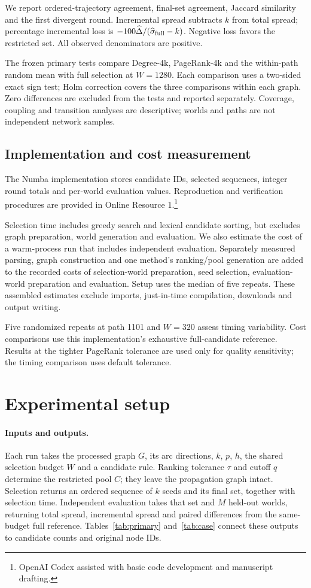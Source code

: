\documentclass[smallextended]{svjour3}
\begin{document}
We report ordered-trajectory agreement, final-set agreement, Jaccard similarity and the first divergent round. Incremental spread subtracts $k$ from total spread; percentage incremental loss is $-100\widehat\Delta/(\widehat\sigma_{\rm full}-k)$. Negative loss favors the restricted set. All observed denominators are positive.

The frozen primary tests compare Degree-4k, PageRank-4k and the within-path random mean with full selection at $W=1280$. Each comparison uses a two-sided exact sign test; Holm correction covers the three comparisons within each graph. Zero differences are excluded from the tests and reported separately. Coverage, coupling and transition analyses are descriptive; worlds and paths are not independent network samples.

\subsection{Implementation and cost measurement}
The Numba implementation stores candidate IDs, selected sequences, integer round totals and per-world evaluation values. Reproduction and verification procedures are provided in Online Resource 1.\footnote{OpenAI Codex assisted with basic code development and manuscript drafting.}

Selection time includes greedy search and lexical candidate sorting, but excludes graph preparation, world generation and evaluation. We also estimate the cost of a warm-process run that includes independent evaluation. Separately measured parsing, graph construction and one method's ranking/pool generation are added to the recorded costs of selection-world preparation, seed selection, evaluation-world preparation and evaluation. Setup uses the median of five repeats. These assembled estimates exclude imports, just-in-time compilation, downloads and output writing.

Five randomized repeats at path 1101 and $W=320$ assess timing variability. Cost comparisons use this implementation's exhaustive full-candidate reference. Results at the tighter PageRank tolerance are used only for quality sensitivity; the timing comparison uses default tolerance.

\section{Experimental setup}\label{sec:experimental-setup}
\paragraph{Inputs and outputs.} Each run takes the processed graph $G$, its arc directions, $k$, $p$, $h$, the shared selection budget $W$ and a candidate rule. Ranking tolerance $\tau$ and cutoff $q$ determine the restricted pool $C$; they leave the propagation graph intact. Selection returns an ordered sequence of $k$ seeds and its final set, together with selection time. Independent evaluation takes that set and $M$ held-out worlds, returning total spread, incremental spread and paired differences from the same-budget full reference. Tables~\ref{tab:primary} and~\ref{tab:case} connect these outputs to candidate counts and original node IDs.
\end{document}
